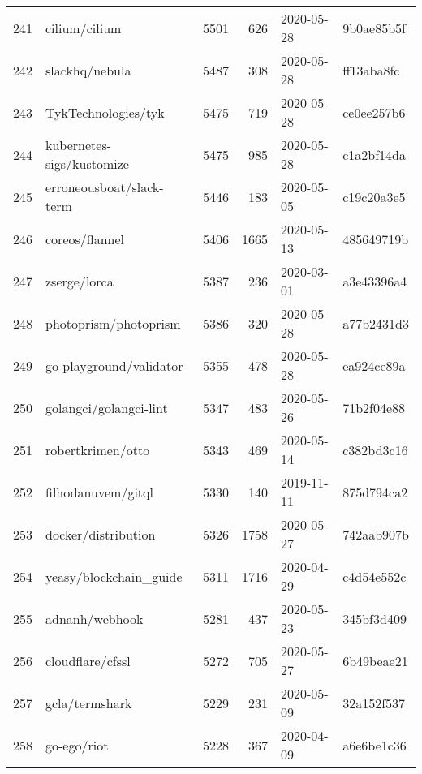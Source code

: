 \begin{longtable}{llrrll}
    241 &                                      cilium/cilium &   5501 &    626 & 2020-05-28 &  9b0ae85b5f \\
    242 &                                     slackhq/nebula &   5487 &    308 & 2020-05-28 &  ff13aba8fc \\
    243 &                                TykTechnologies/tyk &   5475 &    719 & 2020-05-28 &  ce0ee257b6 \\
    244 &                          kubernetes-sigs/kustomize &   5475 &    985 & 2020-05-28 &  c1a2bf14da \\
    245 &                           erroneousboat/slack-term &   5446 &    183 & 2020-05-05 &  c19c20a3e5 \\
    246 &                                     coreos/flannel &   5406 &   1665 & 2020-05-13 &  485649719b \\
    247 &                                       zserge/lorca &   5387 &    236 & 2020-03-01 &  a3e43396a4 \\
    248 &                              photoprism/photoprism &   5386 &    320 & 2020-05-28 &  a77b2431d3 \\
    249 &                            go-playground/validator &   5355 &    478 & 2020-05-28 &  ea924ce89a \\
    250 &                             golangci/golangci-lint &   5347 &    483 & 2020-05-26 &  71b2f04e88 \\
    251 &                                  robertkrimen/otto &   5343 &    469 & 2020-05-14 &  c382bd3c16 \\
    252 &                                 filhodanuvem/gitql &   5330 &    140 & 2019-11-11 &  875d794ca2 \\
    253 &                                docker/distribution &   5326 &   1758 & 2020-05-27 &  742aab907b \\
    254 &                             yeasy/blockchain\_guide &   5311 &   1716 & 2020-04-29 &  c4d54e552c \\
    255 &                                     adnanh/webhook &   5281 &    437 & 2020-05-23 &  345bf3d409 \\
    256 &                                   cloudflare/cfssl &   5272 &    705 & 2020-05-27 &  6b49beae21 \\
    257 &                                     gcla/termshark &   5229 &    231 & 2020-05-09 &  32a152f537 \\
    258 &                                        go-ego/riot &   5228 &    367 & 2020-04-09 &  a6e6be1c36 \\

\end{longtable}
